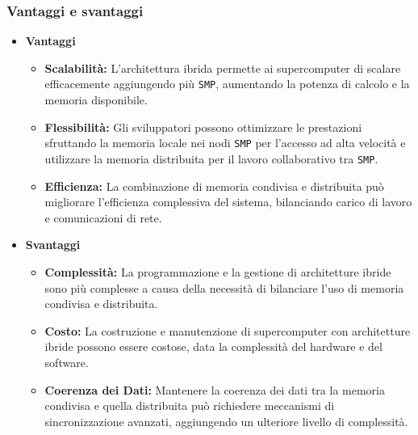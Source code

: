 \subsubsection{Vantaggi e svantaggi}
\begin{itemize}
    \item \textbf{Vantaggi} 
    \begin{itemize}
        \item \textbf{Scalabilità:} L'architettura ibrida permette ai supercomputer
        di scalare efficacemente aggiungendo più \texttt{SMP}, aumentando la potenza di
        calcolo e la memoria disponibile.
        \item \textbf{Flessibilità:} Gli sviluppatori possono ottimizzare
        le prestazioni sfruttando la memoria locale nei nodi \texttt{SMP} per l'accesso
        ad alta velocità e utilizzare la memoria distribuita per il lavoro
        collaborativo tra \texttt{SMP}.
        \item \textbf{Efficienza:} La combinazione di memoria condivisa e
        distribuita può migliorare l'efficienza complessiva del sistema,
        bilanciando carico di lavoro e comunicazioni di rete.
    \end{itemize}
    \item \textbf{Svantaggi}
    \begin{itemize}
        \item \textbf{Complessità:} La programmazione e la gestione di architetture
        ibride sono più complesse a causa della necessità di bilanciare l'uso
        di memoria condivisa e distribuita.
        \item \textbf{Costo:} La costruzione e manutenzione di supercomputer con
        architetture ibride possono essere costose, data la complessità del
        hardware e del software.
        \item \textbf{Coerenza dei Dati:} Mantenere la coerenza dei dati tra
        la memoria condivisa e quella distribuita può richiedere meccanismi di
        sincronizzazione avanzati, aggiungendo un ulteriore livello di complessità.
    \end{itemize}
\end{itemize}